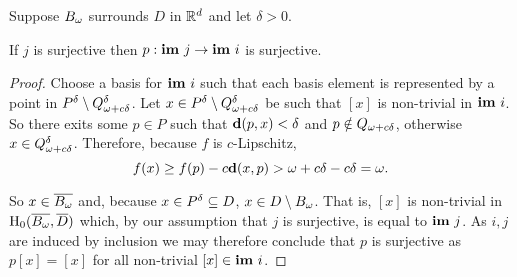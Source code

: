\begin{lemma}\label{lem:psurj}
  Suppose $\B$ surrounds $D$ in $\R^d$ and let $\delta > 0$.

  If $j$ is surjective then $p : \im~j\to\im~i$ is surjective.
\end{lemma}
\begin{proof}
  Choose a basis for $\im~i$ such that each basis element is represented by a point in $\P\setminus \QQ^\of$.
  Let $x\in \P\setminus \QQ^\of$ be such that $[x]$ is non-trivial in $\im~i$.
  So there exits some $p\in P$ such that $\dist(p, x) < \delta$ and $p\notin \QQ$, otherwise $x\in\QQ^\of$.
  Therefore, because $f$ is $c$-Lipschitz,
  \[ f(x)\geq f(p) - c\dist(x, p) > \fenn - c\of =\omega.\]

  So $x\in\cmp{\B}$ and, because $x\in \P\subseteq D$, $x\in D\setminus \B$.
  That is, $[x]$ is non-trivial in $\hom_0(\cmp{\B},\cmp{D})$ which, by our assumption that $j$ is surjective, is equal to $\im~j$.
  As $i, j$ are induced by inclusion we may therefore conclude that $p$ is surjective as $p[x] = [x]$ for all non-trivial $[x]\in\im~i$.

\end{proof}
